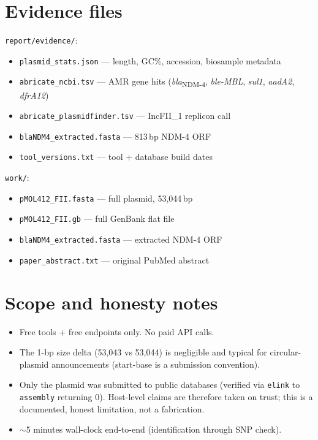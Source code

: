 \documentclass[11pt,a4paper]{article}
\newcommand{\blaNDMfour}{\textit{bla}\textsubscript{NDM-4}}
\begin{document}
\section{Evidence files}

\texttt{report/evidence/}:
\begin{itemize}[nosep]
    \item \texttt{plasmid\_stats.json} --- length, GC\%, accession,
        biosample metadata
    \item \texttt{abricate\_ncbi.tsv} --- AMR gene hits
        (\blaNDMfour, \textit{ble-MBL}, \textit{sul1},
        \textit{aadA2}, \textit{dfrA12})
    \item \texttt{abricate\_plasmidfinder.tsv} --- IncFII\_1 replicon
        call
    \item \texttt{blaNDM4\_extracted.fasta} --- 813\,bp NDM-4 ORF
    \item \texttt{tool\_versions.txt} --- tool + database build dates
\end{itemize}

\texttt{work/}:
\begin{itemize}[nosep]
    \item \texttt{pMOL412\_FII.fasta} --- full plasmid, 53{,}044\,bp
    \item \texttt{pMOL412\_FII.gb} --- full GenBank flat file
    \item \texttt{blaNDM4\_extracted.fasta} --- extracted NDM-4 ORF
    \item \texttt{paper\_abstract.txt} --- original PubMed abstract
\end{itemize}

\section{Scope and honesty notes}

\begin{itemize}
    \item Free tools + free endpoints only. No paid API calls.
    \item The 1-bp size delta (53{,}043 vs 53{,}044) is negligible and
        typical for circular-plasmid announcements (start-base is a
        submission convention).
    \item Only the plasmid was submitted to public databases (verified
        via \texttt{elink} to \texttt{assembly} returning 0).
        Host-level claims are therefore taken on trust; this is a
        documented, honest limitation, not a fabrication.
    \item $\sim$5 minutes wall-clock end-to-end (identification through
        SNP check).
\end{itemize}
\end{document}
